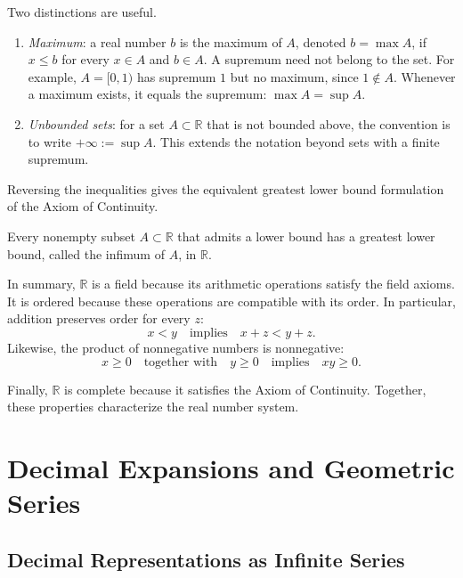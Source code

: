 Two distinctions are useful.
\begin{enumerate}
\item \textit{Maximum}: a real number $b$ is the maximum of $A$, denoted $b = \max A$, if $x \leq b$ for every $x \in A$ and $b \in A$.
A supremum need not belong to the set. For example, $A = [0,1)$ has supremum $1$ but no maximum, since $1 \notin A$.
Whenever a maximum exists, it equals the supremum: $\max A = \sup A$.
\item \textit{Unbounded sets}: for a set $A \subset \mathbb{R}$ that is not bounded above, the convention is to write $+\infty := \sup A$.
This extends the notation beyond sets with a finite supremum.
\end{enumerate}

Reversing the inequalities gives the equivalent greatest lower bound formulation of the Axiom of Continuity.

\begin{theorem}
Every nonempty subset $A \subset \mathbb{R}$ that admits a lower bound has a greatest lower bound, called the infimum of $A$, in $\mathbb{R}$.
\end{theorem}

In summary, $\mathbb{R}$ is a field because its arithmetic operations satisfy the field axioms. It is ordered because these operations are compatible
with its order. In particular, addition preserves order for every $z$:
\[
x < y \quad \text{implies} \quad x+z < y+z.
\]
Likewise, the product of nonnegative numbers is nonnegative:
\[
x \geq 0 \quad \text{together with} \quad y \geq 0 \quad \text{implies} \quad xy \geq 0.
\]

Finally, $\mathbb{R}$ is complete because it satisfies the Axiom of Continuity.
Together, these properties characterize the real number system.



\section{Decimal Expansions and Geometric Series}

\subsection{Decimal Representations as Infinite Series}

